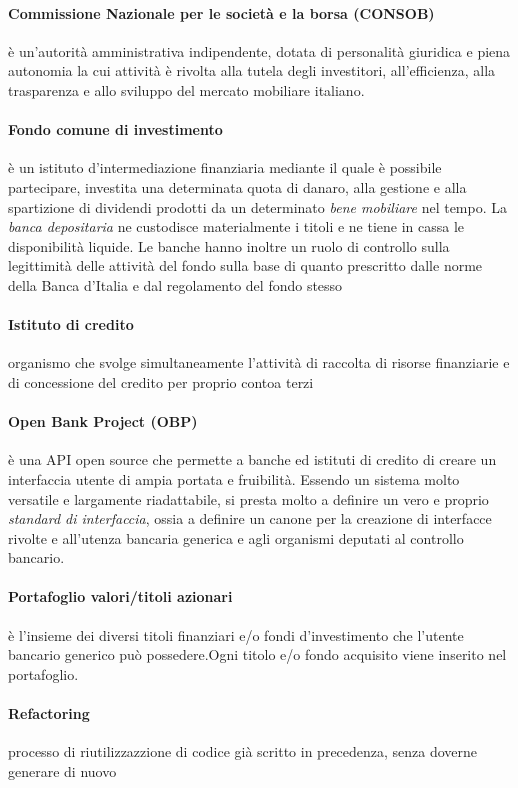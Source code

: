 \paragraph{Commissione Nazionale per le societ\`a e la borsa (CONSOB)}
	è un'autorità amministrativa indipendente, dotata di personalità giuridica e piena autonomia la cui attività è rivolta alla tutela degli investitori, all'efficienza, alla trasparenza e allo sviluppo del mercato mobiliare italiano. \cite{consob_wiki}
\paragraph{Fondo comune di investimento}
	è un istituto d'intermediazione finanziaria mediante il quale è possibile partecipare, investita una determinata quota di danaro, alla gestione e alla spartizione di dividendi prodotti da un determinato \emph{bene mobiliare} nel tempo. La \emph{banca depositaria} ne custodisce materialmente i titoli e ne tiene in cassa le disponibilità liquide. Le banche hanno inoltre un ruolo di controllo sulla legittimità delle attività del fondo sulla base di quanto prescritto dalle norme della Banca d'Italia e dal regolamento del fondo stesso
\paragraph{Istituto di credito}
	organismo che svolge simultaneamente l’attività di raccolta di risorse finanziarie e di concessione del credito per proprio contoa terzi 
\paragraph{Open Bank Project (OBP)}
	è una API open source che permette a banche ed istituti di credito di creare un interfaccia utente di ampia portata e fruibilità. Essendo un sistema molto versatile e largamente riadattabile, si presta molto a definire un vero e proprio \emph{standard di interfaccia}, ossia a definire un canone per la creazione di interfacce rivolte e all'utenza bancaria generica e agli organismi deputati al controllo bancario. \cite{obp}
\paragraph{Portafoglio valori/titoli azionari}
	è l'insieme dei diversi titoli finanziari e/o fondi d'investimento che l'utente bancario generico può possedere.Ogni titolo e/o fondo acquisito viene inserito nel portafoglio.
\paragraph{Refactoring}
	processo di riutilizzazzione di codice già scritto in precedenza, senza doverne generare di nuovo
